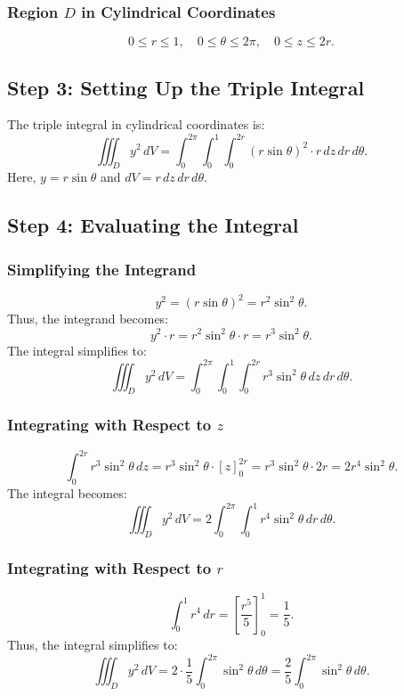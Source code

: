 \documentclass[11pt]{article}
\begin{document}
\subsubsection{Region \( D \) in Cylindrical Coordinates}
\[
0 \leq r \leq 1, \quad 0 \leq \theta \leq 2\pi, \quad 0 \leq z \leq 2r.
\]

\subsection{Step 3: Setting Up the Triple Integral}

The triple integral in cylindrical coordinates is:
\[
\iiint_{D} y^2 \, dV = \int_{0}^{2\pi} \int_{0}^{1} \int_{0}^{2r} (r\sin\theta)^2 \cdot r \, dz \, dr \, d\theta.
\]
Here, \( y = r\sin\theta \) and \( dV = r \, dz \, dr \, d\theta \).

\newpage

\subsection{Step 4: Evaluating the Integral}

\subsubsection{Simplifying the Integrand}
\[
y^2 = (r\sin\theta)^2 = r^2\sin^2\theta.
\]
Thus, the integrand becomes:
\[
y^2 \cdot r = r^2\sin^2\theta \cdot r = r^3\sin^2\theta.
\]
The integral simplifies to:
\[
\iiint_{D} y^2 \, dV = \int_{0}^{2\pi} \int_{0}^{1} \int_{0}^{2r} r^3\sin^2\theta \, dz \, dr \, d\theta.
\]

\subsubsection{Integrating with Respect to \( z \)}
\[
\int_{0}^{2r} r^3\sin^2\theta \, dz = r^3\sin^2\theta \cdot \left[ z \right]_{0}^{2r} = r^3\sin^2\theta \cdot 2r = 2r^4\sin^2\theta.
\]
The integral becomes:
\[
\iiint_{D} y^2 \, dV = 2 \int_{0}^{2\pi} \int_{0}^{1} r^4\sin^2\theta \, dr \, d\theta.
\]

\subsubsection{Integrating with Respect to \( r \)}
\[
\int_{0}^{1} r^4 \, dr = \left[ \frac{r^5}{5} \right]_{0}^{1} = \frac{1}{5}.
\]
Thus, the integral simplifies to:
\[
\iiint_{D} y^2 \, dV = 2 \cdot \frac{1}{5} \int_{0}^{2\pi} \sin^2\theta \, d\theta = \frac{2}{5} \int_{0}^{2\pi} \sin^2\theta \, d\theta.
\]
\end{document}
